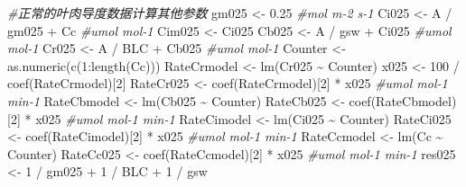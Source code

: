 \documentclass[
]{krantz}
\makeatletter
\newenvironment{Shaded}{\begin{snugshade}}{\end{snugshade}}
\newcommand{\CommentTok}[1]{\textcolor[rgb]{0.56,0.35,0.01}{\textit{#1}}}
\newcommand{\DecValTok}[1]{\textcolor[rgb]{0.00,0.00,0.81}{#1}}
\newcommand{\FloatTok}[1]{\textcolor[rgb]{0.00,0.00,0.81}{#1}}
\newcommand{\FunctionTok}[1]{\textcolor[rgb]{0.00,0.00,0.00}{#1}}
\newcommand{\NormalTok}[1]{#1}
\newcommand{\OtherTok}[1]{\textcolor[rgb]{0.56,0.35,0.01}{#1}}
\newcommand{\SpecialCharTok}[1]{\textcolor[rgb]{0.00,0.00,0.00}{#1}}
\newenvironment{kframe}{%
\medskip{}
\setlength{\fboxsep}{.8em}
 \def\at@end@of@kframe{}%
 \ifinner\ifhmode%
  \def\at@end@of@kframe{\end{minipage}}%
  \begin{minipage}{\columnwidth}%
 \fi\fi%
 \def\FrameCommand##1{\hskip\@totalleftmargin \hskip-\fboxsep
 \colorbox{shadecolor}{##1}\hskip-\fboxsep
     \hskip-\linewidth \hskip-\@totalleftmargin \hskip\columnwidth}%
 \MakeFramed {\advance\hsize-\width
   \@totalleftmargin\z@ \linewidth\hsize
   \@setminipage}}%
 {\par\unskip\endMakeFramed%
 \at@end@of@kframe}
\renewenvironment{Shaded}{\begin{kframe}}{\end{kframe}}
\makeatother
\begin{document}
\begin{Shaded}
\begin{Highlighting}[]
\CommentTok{\#正常的叶肉导度数据计算其他参数}
\NormalTok{gm025 }\OtherTok{\textless{}{-}} \FloatTok{0.25} \CommentTok{\#mol m{-}2 s{-}1}
\NormalTok{Ci025 }\OtherTok{\textless{}{-}}\NormalTok{ A }\SpecialCharTok{/}\NormalTok{ gm025 }\SpecialCharTok{+}\NormalTok{ Cc }\CommentTok{\#umol mol{-}1}
\NormalTok{Cim025 }\OtherTok{\textless{}{-}}\NormalTok{ Ci025}
\NormalTok{Cb025 }\OtherTok{\textless{}{-}}\NormalTok{ A }\SpecialCharTok{/}\NormalTok{ gsw }\SpecialCharTok{+}\NormalTok{ Ci025 }\CommentTok{\#umol mol{-}1}
\NormalTok{Cr025 }\OtherTok{\textless{}{-}}\NormalTok{ A }\SpecialCharTok{/}\NormalTok{ BLC }\SpecialCharTok{+}\NormalTok{ Cb025 }\CommentTok{\#umol mol{-}1}
\NormalTok{Counter }\OtherTok{\textless{}{-}} \FunctionTok{as.numeric}\NormalTok{(}\FunctionTok{c}\NormalTok{(}\DecValTok{1}\SpecialCharTok{:}\FunctionTok{length}\NormalTok{(Cc)))}
\NormalTok{RateCrmodel }\OtherTok{\textless{}{-}} \FunctionTok{lm}\NormalTok{(Cr025 }\SpecialCharTok{\textasciitilde{}}\NormalTok{ Counter)}
\NormalTok{x025 }\OtherTok{\textless{}{-}} \DecValTok{100} \SpecialCharTok{/} \FunctionTok{coef}\NormalTok{(RateCrmodel)[}\DecValTok{2}\NormalTok{]}
\NormalTok{RateCr025 }\OtherTok{\textless{}{-}} \FunctionTok{coef}\NormalTok{(RateCrmodel)[}\DecValTok{2}\NormalTok{] }\SpecialCharTok{*}\NormalTok{ x025 }\CommentTok{\#umol mol{-}1 min{-}1}
\NormalTok{RateCbmodel }\OtherTok{\textless{}{-}} \FunctionTok{lm}\NormalTok{(Cb025 }\SpecialCharTok{\textasciitilde{}}\NormalTok{ Counter)}
\NormalTok{RateCb025 }\OtherTok{\textless{}{-}} \FunctionTok{coef}\NormalTok{(RateCbmodel)[}\DecValTok{2}\NormalTok{] }\SpecialCharTok{*}\NormalTok{ x025 }\CommentTok{\#umol mol{-}1 min{-}1}
\NormalTok{RateCimodel }\OtherTok{\textless{}{-}} \FunctionTok{lm}\NormalTok{(Ci025 }\SpecialCharTok{\textasciitilde{}}\NormalTok{ Counter)}
\NormalTok{RateCi025 }\OtherTok{\textless{}{-}} \FunctionTok{coef}\NormalTok{(RateCimodel)[}\DecValTok{2}\NormalTok{] }\SpecialCharTok{*}\NormalTok{ x025 }\CommentTok{\#umol mol{-}1 min{-}1}
\NormalTok{RateCcmodel }\OtherTok{\textless{}{-}} \FunctionTok{lm}\NormalTok{(Cc }\SpecialCharTok{\textasciitilde{}}\NormalTok{ Counter)}
\NormalTok{RateCc025 }\OtherTok{\textless{}{-}} \FunctionTok{coef}\NormalTok{(RateCcmodel)[}\DecValTok{2}\NormalTok{] }\SpecialCharTok{*}\NormalTok{ x025 }\CommentTok{\#umol mol{-}1 min{-}1}
\NormalTok{res025 }\OtherTok{\textless{}{-}} \DecValTok{1} \SpecialCharTok{/}\NormalTok{ gm025 }\SpecialCharTok{+} \DecValTok{1} \SpecialCharTok{/}\NormalTok{ BLC }\SpecialCharTok{+} \DecValTok{1} \SpecialCharTok{/}\NormalTok{ gsw}


\end{Highlighting}
\end{Shaded}
\end{document}
